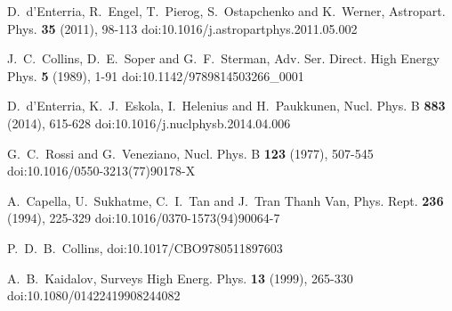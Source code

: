 
\begin{thebibliography}{99}


D.~d'Enterria, R.~Engel, T.~Pierog, S.~Ostapchenko and K.~Werner,
Astropart. Phys. \textbf{35} (2011), 98-113
doi:10.1016/j.astropartphys.2011.05.002

J.~C.~Collins, D.~E.~Soper and G.~F.~Sterman,
Adv. Ser. Direct. High Energy Phys. \textbf{5} (1989), 1-91
doi:10.1142/9789814503266\_0001


D.~d'Enterria, K.~J.~Eskola, I.~Helenius and H.~Paukkunen,
Nucl. Phys. B \textbf{883} (2014), 615-628
doi:10.1016/j.nuclphysb.2014.04.006

G.~C.~Rossi and G.~Veneziano,
Nucl. Phys. B \textbf{123} (1977), 507-545
doi:10.1016/0550-3213(77)90178-X

A.~Capella, U.~Sukhatme, C.~I.~Tan and J.~Tran Thanh Van,
Phys. Rept. \textbf{236} (1994), 225-329
doi:10.1016/0370-1573(94)90064-7

P.~D.~B.~Collins,
doi:10.1017/CBO9780511897603

A.~B.~Kaidalov,
Surveys High Energ. Phys. \textbf{13} (1999), 265-330
doi:10.1080/01422419908244082


\end{thebibliography}
